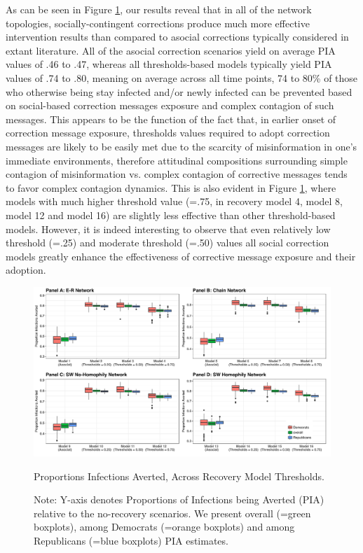 \documentclass[man, 12pt, a4paper, nolmodern, noextraspace]{apa6}
\begin{document}
  As can be seen in Figure \ref{fig:Figure4}, our results reveal that in all of the network topologies, socially-contingent corrections  produce much more effective intervention results than compared to asocial corrections typically considered in extant literature. All of the asocial correction scenarios yield on average PIA values of .46 to .47, whereas all thresholds-based models typically yield PIA values of .74 to .80, meaning on average across all time points, 74 to 80\% of those who otherwise being stay infected and/or newly infected can be prevented based on social-based correction messages exposure and complex contagion of such messages. This appears to be the function of the fact that, in earlier onset of correction message exposure, thresholds values required to adopt correction messages are likely to be easily met due to the scarcity of misinformation in one's immediate environments, therefore attitudinal compositions surrounding simple contagion of misinformation vs. complex contagion of corrective messages tends to favor complex contagion dynamics. This is also evident in Figure \ref{fig:Figure4}, where models with much higher threshold value (=.75, in recovery model 4, model 8, model 12 and model 16) are slightly less effective than other threshold-based models. However, it is indeed interesting to observe that even relatively low threshold (=.25) and moderate threshold (=.50) values all social correction models greatly enhance the effectiveness of corrective message exposure and their adoption.  
  
\begin{figure}
    \centering
        \includegraphics[clip, width=\linewidth]{draft/Fig4.pdf} 

    \captionsetup{format=hang}
    \caption{Proportions Infections Averted, Across Recovery Model Thresholds.} 
    \label{fig:Figure4}
    \captionsetup{font=small}
    \caption*{Note: Y-axis denotes Proportions of Infections being Averted (PIA) relative to the no-recovery scenarios. We present overall (=green boxplots), among Democrats (=orange boxplots) and among Republicans (=blue boxplots) PIA estimates.} 
\end{figure}        
        
\end{document}
